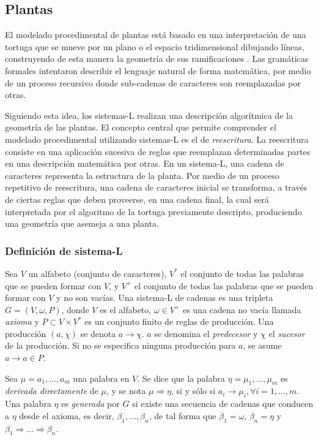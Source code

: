 \subsection{Plantas}
El modelado procedimental de plantas está basado en una interpretación de una tortuga que se mueve por un plano o el espacio tridimensional dibujando líneas, construyendo de esta manera la geometría de sus ramificaciones \cite{Prusinkiewicz1986}.
Las gramáticas formales \cite{Chomsky1956} intentaron describir el lenguaje natural de forma matemática, por medio de un proceso recursivo donde sub-cadenas de caracteres son reemplazadas por otras.

Siguiendo esta idea, los sistemas-L \cite{Lindenmayer1968} realizan una descripción algorítmica de la geometría de las plantas.
El concepto central que permite comprender el modelado procedimental utilizando sistemas-L es el de {\em reescritura}.
La reescritura consiste en una aplicación sucesiva de reglas que reemplazan determinadas partes en una descripción matemática por otras.
En un sistema-L, una cadena de caracteres representa la estructura de la planta.
Por medio de un proceso repetitivo de reescritura, una cadena de caracteres inicial se transforma, a través de ciertas reglas que deben proveerse, en una cadena final, la cual será interpretada por el algoritmo de la tortuga previamente descripto, produciendo una geometría que asemeja a una planta.

\subsubsection{Definición de sistema-L}
Sea $V$ un alfabeto (conjunto de caracteres), $V^{*}$ el conjunto de todas las palabras que se pueden formar con $V$, y $V^{+}$ el conjunto de todas las palabras que se pueden formar con $V$ y no son vacías.
Una sistema-L de cadenas es una tripleta $G = (V,\omega,P)$, donde $V$ es el alfabeto, $\omega \in V^{+}$ es una cadena no vacía llamada {\em axioma} y $P \subset V \times V^{*}$ es un conjunto finito de reglas de producción.
Una producción $(a,\chi)$ se denota $a \rightarrow \chi$.
$a$ se denomina el {\em predecesor} y $\chi$ el {\em sucesor} de la producción.
Si no se especifica ninguna producción para $a$, se asume $a \rightarrow a \in P$.

Sea $\mu = a_{1}, \dots, a_{m}$ una palabra en $V$.
Se dice que la palabra $\eta = \mu_{1}, \dots, \mu_{m}$ es {\em derivada directamente} de $\mu$, y se nota $\mu \Rightarrow \eta$,  si y sólo si $a_{i} \rightarrow \mu_{i}, \forall i = 1, \dots, m$.
Una palabra $\eta$ es {\it generada} por $G$ si existe una secuencia de cadenas que conducen a $\eta$ desde el axioma, es decir, $\beta_{1},\dots,\beta_{n}$, de tal forma que $\beta_{1} = \omega$, $\beta_{n} = \eta$ y $\beta_{1} \Rightarrow \dots  \Rightarrow \beta_{n}$.

